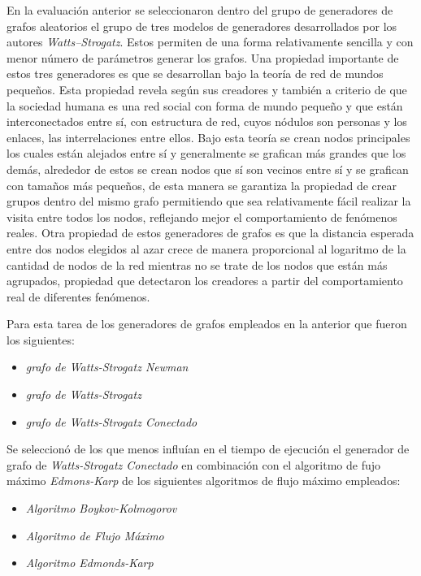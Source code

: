 \documentclass{article}
\begin{document}
En la evaluación anterior se seleccionaron dentro del grupo de generadores de grafos aleatorios el grupo de tres modelos de generadores desarrollados por los autores \textit{Watts–Strogatz}\cite{generadoraws}. Estos permiten de una forma relativamente sencilla y con menor número de parámetros generar los grafos. Una propiedad importante de estos tres generadores es que se desarrollan bajo la teoría de red de mundos pequeños. Esta propiedad revela según sus creadores y también a criterio de\cite{Solares} que la sociedad humana es una red social con forma de mundo pequeño y que están interconectados entre sí, con estructura de red, cuyos nódulos son personas y los enlaces, las interrelaciones entre ellos. Bajo esta teoría se crean nodos principales los cuales están alejados entre sí y generalmente se grafican más grandes que los demás, alrededor de estos se crean nodos que sí son vecinos entre sí y se grafican con tamaños más pequeños, de esta manera se garantiza la propiedad de crear grupos dentro del mismo grafo permitiendo que sea relativamente fácil realizar la visita entre todos los nodos, reflejando mejor el comportamiento de fenómenos reales. Otra propiedad de estos generadores de grafos es que la distancia esperada entre dos nodos elegidos al azar crece de manera proporcional al logaritmo de la cantidad de nodos de la red mientras no se trate de los nodos que están más agrupados, propiedad que detectaron los creadores a partir del comportamiento real de diferentes fenómenos\cite{wys}.

Para esta tarea de los generadores de grafos empleados en la anterior que fueron los siguientes:

\begin{itemize}
\item \textit{grafo de Watts-Strogatz Newman }
\item \textit{grafo de Watts-Strogatz }
\item \textit{grafo de Watts-Strogatz Conectado}
\end{itemize}
%

Se seleccionó de los que menos influían en el tiempo de ejecución el generador de grafo de \textit{Watts-Strogatz Conectado} en combinación con el algoritmo de fujo  máximo \textit{Edmons-Karp} de los siguientes algoritmos de flujo máximo empleados: 

\begin{itemize}
\item \textit{Algoritmo Boykov-Kolmogorov }
\item \textit{Algoritmo de Flujo Máximo}
\item \textit{Algoritmo Edmonds-Karp}
\end{itemize} 
 
\end{document}
